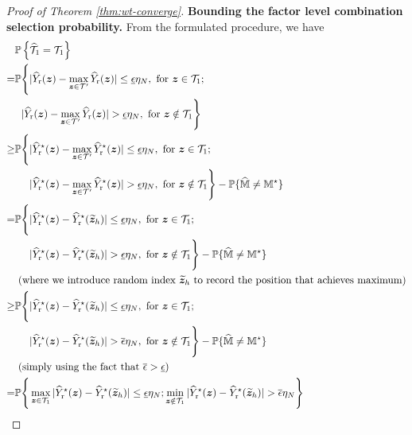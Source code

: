 \documentclass[12pt]{article}
\begin{document}
\begin{proof}[Proof of Theorem \ref{thm:wt-converge}]
    \textbf{Bounding the factor level combination selection probability.} From the formulated procedure, we have
    \begingroup
    \allowdisplaybreaks
    \begin{align*}
        &\bbP\lt\{\hat{\cT}_{1} = {\cT}_{1} \rt\} \\
        = & \bbP\Bigg\{|\hY_{\operatorname{r}}(\bz)-\max_{\bz\in\cT'}\hY_{\operatorname{r}}(\bz)| \le \underline{\epsilon}\eta_N ,  \text{ for }\bz\in\cT_{1} ; \\
        &\phantom{ \bbP } |\hY_{\operatorname{r}}(\bz)-\max_{\bz\in\cT'}\hY_{\operatorname{r}}(\bz)| > \underline{\epsilon}\eta_N ,  \text{ for }\bz\notin\cT_{1}\Bigg\} \\
        \ge & \bbP\Bigg\{  |\hY^\star_{\operatorname{r}}(\bz)-\max_{\bz\in\cT'}\hY^\star_{\operatorname{r}}(\bz)| \le \underline{\epsilon}\eta_N ,  \text{ for }\bz\in\cT_{1} ; \\
        &\phantom{ \bbP\Bigg\{  } |\hY^\star_{\operatorname{r}}(\bz)-\max_{\bz\in\cT'}\hY^\star_{\operatorname{r}}(\bz)| > \underline{\epsilon}\eta_N ,  \text{ for }\bz\notin\cT_{1}\Bigg\} - \bbP\{\hat{\bbM}\neq \bbM^\star\}\\
        = & \bbP\Bigg\{    |\hY^\star_{\operatorname{r}}(\bz)-\hY^\star_{\operatorname{r}}(\tilde{\bz}_h)| \le \underline{\epsilon}\eta_N ,  \text{ for }\bz\in\cT_{1} ; \\
        &\phantom{ \bbP\Bigg\{  } |\hY^\star_{\operatorname{r}}(\bz)-\hY^\star_{\operatorname{r}}(\tilde{\bz}_h)| > \underline{\epsilon}\eta_N ,  \text{ for }\bz\notin\cT_{1}\Bigg\}  - \bbP\{\hat{\bbM}\neq \bbM^\star\}\\
        &\see{where we introduce random index $\tilde{\bz}_h$ to record the position that achieves maximum} \\
       \ge & \bbP\Bigg\{    |\hY^\star_{\operatorname{r}}(\bz)-\hY^\star_{\operatorname{r}}(\tilde{\bz}_h)| \le \underline{\epsilon}\eta_N ,  \text{ for }\bz\in\cT_{1} ; \\
        &\phantom{ \bbP\Bigg\{  } |\hY^\star_{\operatorname{r}}(\bz)-\hY^\star_{\operatorname{r}}(\tilde{\bz}_h)| > \overline{\epsilon}\eta_N ,  \text{ for }\bz\notin\cT_{1}\Bigg\}  - \bbP\{\hat{\bbM}\neq \bbM^\star\}\\
        &\see{simply using the fact that $\overline{\epsilon} > \underline{\epsilon}$} \\
        = & \bbP\Bigg\{    \max_{\bz\in\cT_{1}}|\hY^\star_{\operatorname{r}}(\bz)-\hY^\star_{\operatorname{r}}(\tilde{\bz}_h)| \le \underline{\epsilon}\eta_N;  \min_{\bz\notin\cT_{1}}|\hY^\star_{\operatorname{r}}(\bz)-\hY^\star_{\operatorname{r}}(\tilde{\bz}_h)| > \overline{\epsilon}\eta_N\Bigg\} \\

\end{align*}
\end{proof}
\end{document}
